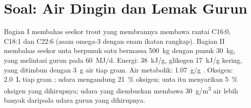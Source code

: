 \section{Soal: Air Dingin dan Lemak Gurun}

\begin{problem}
\label{pb:b1:lipids:1}
Bagian I membahas seekor trout yang  membrannya membawa rantai
C16:0, C18:1 dan C22:6 (asam omega-3 dengan enam ikatan rangkap).
Bagian II membahas seekor unta berpunuk satu bermassa \qty{500}{kg}
dengan punuk  \qty{30}{kg}, yang melintasi gurun pada  \qty{60}{MJ/d}. Energi:  \qty{38}{kJ/g}, glikogen
\qty{17}{kJ/g} kering, yang ditimbun dengan \qty{3}{g} air tiap gram.
Air metabolik: \qty{1.07}{g/g} . Oksigen: \qty{2.0}{L} tiap gram
; udara mengandung \qty{21}{\%} oksigen; unta itu menyarikan
\qty{5}{\%} oksigen yang dihirupnya; udara yang diembuskan membawa
\qty{30}{g/m^3} air lebih banyak daripada udara gurun yang dihirupnya.


\end{problem}
